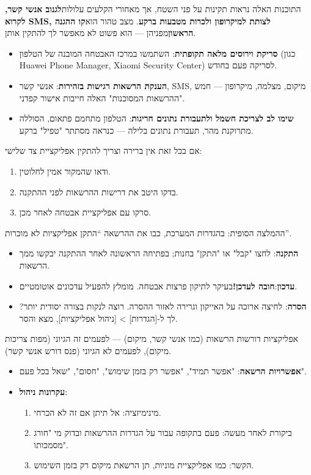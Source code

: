 התוכנות האלה נראות תקינות על פני השטח, אך מאחורי הקלעים עלולות\textbf{לגנוב אנשי קשר, לקרוא SMS, לצותת למיקרופון ולכרות מטבעות ברקע}. מצב טהור הוא\textbf{קו ההגנה הראשון}מפניהן — הוא פשוט לא מאפשר לך להתקין אותן.


\begin{itemize}
  \item \textbf{סריקת וירוסים מלאה תקופתית}: השתמשו במרכז האבטחה המובנה של הטלפון (כגון Huawei Phone Manager, Xiaomi Security Center) לסריקה פעם בחודש.
  \item \textbf{הענקת הרשאות רגישות בזהירות}: אנשי קשר, SMS, מיקום, מצלמה, מיקרופון — חמש "ההרשאות המסוכנות" האלה חייבות אישור קפדני.
  \item \textbf{שימו לב לצריכת חשמל ולתעבורת נתונים חריגות}: הטלפון מתחמם פתאום, הסוללה מתרוקנת מהר, תעבורת נתונים בלילה — כנראה מסתתר "טפיל" ברקע.
\end{itemize}

אם בכל זאת אין ברירה וצריך להתקין אפליקציית צד שלישי:

\begin{enumerate}
  \item ודאו שהמקור אמין לחלוטין.
  \item בדקו היטב את דרישות ההרשאות לפני ההתקנה.
  \item סרקו עם אפליקציית אבטחה לאחר מכן.
\end{enumerate}

ההמלצה הסופית: בהגדרות המערכת, כבו את ההרשאה “התקן אפליקציות לא מוכרות”.


\begin{itemize}
  \item \textbf{התקנה}: לחצו "קבל" או "התקן" בחנות; בפתיחה הראשונה לאחר ההתקנה יבקשו ממך הרשאות.
  \item \textbf{עדכון}:\textbf{חובה לעדכן!}בעיקר לתיקון פרצות אבטחה. מומלץ להפעיל עדכונים אוטומטיים.
  \item \textbf{הסרה}: לחיצה ארוכה על האייקון וגרירה לאזור ההסרה. רוצה לנקות בצורה יסודית יותר? לך ל-[הגדרות] > [ניהול אפליקציות], מצא והסר.
\end{itemize}


אפליקציות דורשות הרשאות (כמו אנשי קשר, מיקום) — לפעמים זה הגיוני (מפות צריכות מיקום), לפעמים לא הגיוני (פנס דורש אנשי קשר).

\begin{itemize}
  \item \textbf{אפשרויות הרשאה}: "אפשר תמיד", "אפשר רק בזמן שימוש", "חסום", "שאל בכל פעם".
  \item \textbf{עקרונות ניהול}:
  \begin{enumerate}
    \item מינימיזציה: אל תיתן אם זה לא הכרחי.
    \item ביקורת לאחר מעשה: פעם בתקופה עבור על הגדרות ההרשאות ובדוק מי "חורג מסמכותו".
    \item הקשר: כמו אפליקציית מוניות, תן הרשאת מיקום רק בזמן השימוש.
  \end{enumerate}
\end{itemize}

